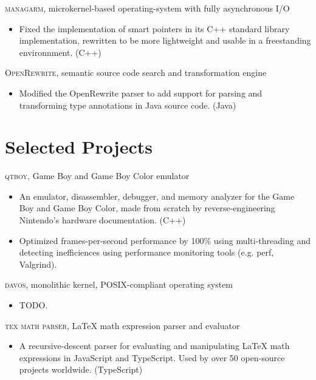 \documentclass[11pt]{article} %
\begin{document}
\textsc{managarm}, microkernel-based operating-system with fully asynchronous I/O
\begin{itemize}
	\item Fixed the implementation of smart pointers in its \textsc{C++} standard library implementation, rewritten to be more lightweight and usable in a freestanding environnment. (C++)
\end{itemize}

\textsc{OpenRewrite}, semantic source code search and transformation engine
\begin{itemize}
	\item Modified the OpenRewrite parser to add support for parsing and transforming type annotations in Java source code. (Java)
\end{itemize}

\section*{Selected Projects}

\textsc{qtboy}, Game Boy and Game Boy Color emulator
\begin{itemize}
	\item An emulator, disassembler, debugger, and memory analyzer for the Game Boy and Game Boy Color, made from scratch by reverse-engineering Nintendo's hardware documentation. (C++)
	\item Optimized frames-per-second performance by 100\% using multi-threading and detecting inefficiences using performance monitoring tools (e.g. perf, Valgrind).
\end{itemize}

\textsc{davos}, monolithic kernel, POSIX-compliant operating system
\begin{itemize}
	\item TODO.
\end{itemize}

\textsc{tex math parser}, \LaTeX{} math expression parser and evaluator
\begin{itemize}
	\item A recursive-descent parser for evaluating and manipulating \LaTeX{} math expressions in JavaScript and TypeScript. Used by over 50 open-source projects worldwide. (TypeScript)
\end{itemize}
\end{document}

